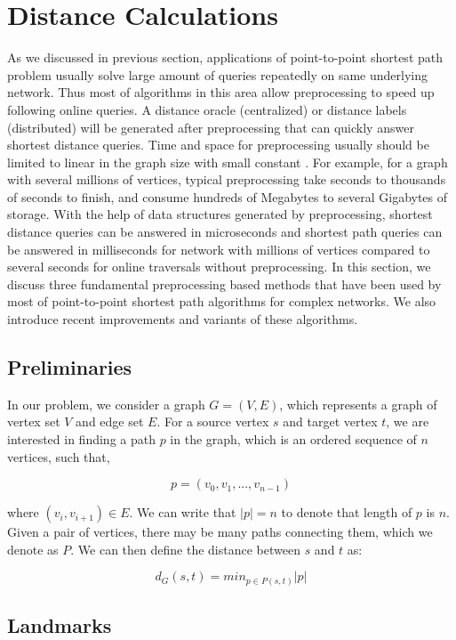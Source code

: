 \section{Distance Calculations}
\label{distance}

As we discussed in previous section, applications of point-to-point shortest path problem usually solve large amount of queries repeatedly on same underlying network. Thus most of algorithms in this area allow preprocessing to speed up following online queries. A distance oracle (centralized) or distance labels (distributed) will be generated after preprocessing that can quickly answer shortest distance queries. Time and space for preprocessing usually should be limited to linear in the graph size with small constant \cite{Goldberg:2005:CSP:1070432.1070455}. For example, for a graph with several millions of vertices, typical preprocessing take seconds to thousands of seconds to finish, and consume hundreds of Megabytes to several Gigabytes of storage. With the help of data structures generated by preprocessing, shortest distance queries can be answered in microseconds and shortest path queries can be answered in milliseconds for network with millions of vertices compared to several seconds for online traversals without preprocessing. In this section, we discuss three fundamental preprocessing based methods that have been used by most of point-to-point shortest path algorithms for complex networks. We also introduce recent improvements and variants of these algorithms.

\subsection{Preliminaries}

In our problem, we consider a graph $G = (V,E)$, which represents a graph of vertex set $V$ and edge set $E$. For a source vertex $s$ and target vertex $t$, we are interested in finding a path $p$ in the graph, which is an ordered sequence of $n$ vertices, such that,

\[
    p = (v_0, v_1, ..., v_{n-1})
\]

where $(v_i, v_{i+1}) \in E$. We can write that $|p| = n$ to denote that length of $p$ is $n$. Given a pair of vertices, there may be many paths connecting them, which we denote as $P$. We can then define the distance between $s$ and $t$ as:

\[
    d_G(s,t) = min_{p \in P(s,t)}|p|
\]

\subsection{Landmarks}

